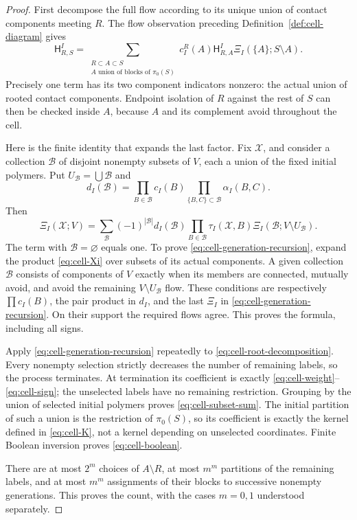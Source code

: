 \begin{proof}
First decompose the full flow according to its unique union of contact
components meeting $R$.  The flow observation preceding
Definition~\ref{def:cell-diagram} gives
\begin{equation}
 \mathsf H^I_{R,S}
 =\sum_{\substack{R\subset A\subset S\\
                   A\text{ union of blocks of }\pi_0(S)}}
       c_I^R(A)\mathsf H^I_{R,A}\Xi_I(\{A\};S\setminus A).
 \label{eq:cell-root-decomposition}
\end{equation}
Precisely one term has its two component indicators nonzero: the actual
union of rooted contact components.  Endpoint isolation of $R$ against
the rest of $S$ can then be checked inside $A$, because $A$ and its
complement avoid throughout the cell.

Here is the finite identity that expands the last factor.  Fix
$\mathcal X$, and consider a collection $\mathcal B$ of disjoint
nonempty subsets of $V$, each a union of the fixed initial polymers.
Put $U_{\mathcal B}=\bigcup\mathcal B$ and
\[
 d_I(\mathcal B)
   =\prod_{B\in\mathcal B}c_I(B)
      \prod_{\{B,C\}\subset\mathcal B}\alpha_I(B,C).
\]
Then
\begin{equation}
 \Xi_I(\mathcal X;V)
 =\sum_{\mathcal B}
       (-1)^{|\mathcal B|}d_I(\mathcal B)
       \prod_{B\in\mathcal B}\tau_I(\mathcal X,B)
       \Xi_I(\mathcal B;V\setminus U_{\mathcal B}).
 \label{eq:cell-generation-recursion}
\end{equation}
The term with $\mathcal B=\varnothing$ equals one.  To prove
\eqref{eq:cell-generation-recursion}, expand the product
\eqref{eq:cell-Xi} over subsets of its actual components.  A given
collection $\mathcal B$ consists of components of $V$ exactly when
its members are connected, mutually avoid, and avoid the remaining
$V\setminus U_{\mathcal B}$ flow.  These conditions are respectively
$\prod c_I(B)$, the pair product in $d_I$, and the last $\Xi_I$ in
\eqref{eq:cell-generation-recursion}.  On their support the required
flows agree.  This proves the formula, including all signs.

Apply \eqref{eq:cell-generation-recursion} repeatedly to
\eqref{eq:cell-root-decomposition}.  Every nonempty selection strictly
decreases the number of remaining labels, so the process terminates.
At termination its coefficient is exactly
\eqref{eq:cell-weight}--\eqref{eq:cell-sign}; the unselected labels
have no remaining restriction.  Grouping by the union of selected
initial polymers proves \eqref{eq:cell-subset-sum}.  The initial
partition of such a union is the restriction of $\pi_0(S)$, so its
coefficient is exactly the kernel defined in \eqref{eq:cell-K}, not a
kernel depending on unselected coordinates.  Finite Boolean inversion
proves \eqref{eq:cell-boolean}.

There are at most $2^m$ choices of $A\setminus R$, at most $m^m$
partitions of the remaining labels, and at most $m^m$ assignments of
their blocks to successive nonempty generations.  This proves the
count, with the cases $m=0,1$ understood separately.
\end{proof}

